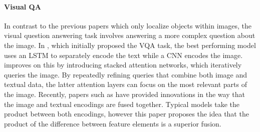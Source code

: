 \documentclass[11pt,a4paper]{article}
\begin{document}
\paragraph{Visual QA} In contrast to the previous papers which only localize objects within images, the visual question answering task involves answering a more complex question about the image. In \citep{VQA}, which initially proposed the VQA task, the best performing model uses an LSTM to separately encode the text while a CNN encodes the image. \citep{stacked_attention} improves on this by introducing stacked attention networks, which iteratively queries the image. By repeatedly refining queries that combine both image and textual data, the latter attention layers can focus on the most relevant parts of the image. Recently, papers such as \cite{Wu_Liu_Wang_Li_2019} have provided innovations in the way that the image and textual encodings are fused together. Typical models take the product between both encodings, however this paper proposes the idea that the product of the difference between feature elements is a superior fusion.
\end{document}

